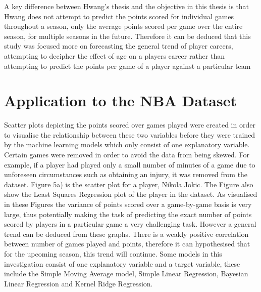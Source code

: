 \documentclass[a4paper,11pt,twoside]{article}
\begin{document}
A key difference between Hwang's thesis and the objective in this thesis is that Hwang does not attempt to predict the points scored for individual games throughout a season, only the average points scored per game over the entire season, for multiple seasons in the future. Therefore it can be deduced that this study was focused more on forecasting the general trend of player careers, attempting to decipher the effect of age on a players career rather than attempting to predict the points per game of a player against a particular team

\newpage

\section{Application to the NBA Dataset}

Scatter plots depicting the points scored over games played were created in order to visualise the relationship between these two variables before they were trained by the machine learning models which only consist of one explanatory variable. Certain games were removed in order to avoid the data from being skewed. For example, if a player had played only a small number of minutes of a game due to unforeseen circumstances such as obtaining an injury, it was removed from the dataset. Figure 5a) is the scatter plot for a player, Nikola Jokic. The Figure also show the Least Squares Regression plot of the player in the dataset. As visualised in these Figures the variance of points scored over a game-by-game basis is very large, thus potentially making the task of predicting the exact number of points scored by players in a particular game a very challenging task. However a general trend can be deduced from these graphs. There is a weakly positive correlation between number of games played and points, therefore it can hypothesised that for the upcoming season, this trend will continue. Some models in this investigation consist of one explanatory variable and a target variable, these include the Simple Moving Average model, Simple Linear Regression, Bayesian Linear Regression and Kernel Ridge Regression.
\end{document}
